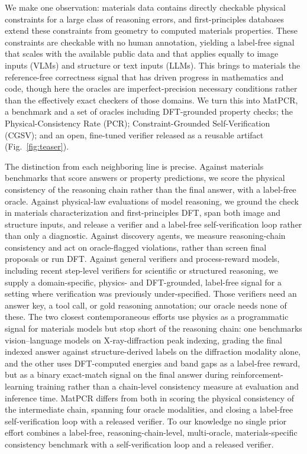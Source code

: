 \documentclass[pdflatex,sn-nature]{sn-jnl}
\begin{document}
We make one observation: materials data contains directly checkable physical
constraints for a large class of reasoning errors, and first-principles databases
extend these constraints from geometry to computed materials properties. These constraints are
checkable with no human annotation, yielding a label-free signal that scales with the
available public data and that applies equally to image inputs (VLMs) and
structure or text inputs (LLMs). This brings to materials the reference-free correctness
signal that has driven progress in mathematics and code, though here the oracles are
imperfect-precision necessary conditions rather than the effectively exact checkers of
those domains. We turn this into MatPCR, a benchmark and a set of
oracles including DFT-grounded property checks; the Physical-Consistency Rate (PCR);
Constraint-Grounded Self-Verification (CGSV); and an open, fine-tuned verifier
released as a reusable artifact (Fig.~\ref{fig:teaser}).

The distinction from each neighboring line is precise. Against materials benchmarks
that score answers or property predictions,\cite{lai2025materials,llm4matbench2024,atomworld2025,matterchat2026}
we score the physical consistency of the reasoning chain rather than the final
answer, with a label-free oracle. Against physical-law evaluations of model
reasoning,\cite{conservationbench2026,p1vl2026} we ground the check in materials
characterization and first-principles DFT, span both image and structure inputs, and
release a verifier and a label-free self-verification loop rather than only a diagnostic.
Against discovery agents,\cite{dreams2025,physrej2025} we measure reasoning-chain
consistency and act on oracle-flagged violations, rather than screen final proposals or
run DFT. Against general verifiers
and process-reward models,\cite{processbench2025,compassverifier2025,t1verify2025}
including recent step-level verifiers for scientific or structured reasoning,\cite{sciprm2026,vprm2026}
we supply a domain-specific, physics- and DFT-grounded, label-free signal for a setting
where verification was previously under-specified. Those verifiers need an answer key, a
tool call, or gold reasoning annotation; our oracle needs none of these. The two closest contemporaneous
efforts use physics as a programmatic signal for materials models but stop short of the
reasoning chain: one benchmarks vision--language models on X-ray-diffraction peak
indexing, grading the final indexed answer against structure-derived labels on the
diffraction modality alone,\cite{crystalxrdbench2026} and the other uses DFT-computed
energies and band gaps as a label-free reward, but as a binary exact-match signal on the
final answer during reinforcement-learning training rather than a chain-level
consistency measure at evaluation and inference time.\cite{matpref2026} MatPCR differs
from both in scoring the physical consistency of the intermediate chain, spanning four
oracle modalities, and closing a label-free self-verification loop with a released
verifier. To our knowledge no single prior effort combines a label-free,
reasoning-chain-level, multi-oracle, materials-specific consistency benchmark with a
self-verification loop and a released verifier.
\end{document}
